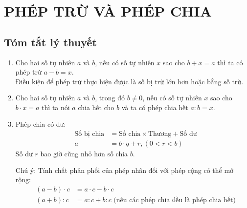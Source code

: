 
\section{PHÉP TRỪ VÀ PHÉP CHIA}
\subsection{Tóm tắt lý thuyết}
\begin{enumerate}
\item Cho hai số tự nhiên $a$ và $b$, nếu có số tự nhiên $x$ sao cho $b + x = a$ thì ta có phép trừ $a - b = x$.\\
Điều kiện để phép trừ thực hiện được là số bị trừ lớn hơn hoặc bằng số trừ.
\item Cho hai số tự nhiên $a$ và $b$, trong đó $b \neq 0$, nếu có số tự nhiên $x$ sao cho $b\cdot x = a$ thì ta nói $a$ chia hết cho $b$ và ta có phép chia hết $a \colon b = x$.
\item Phép chia có dư:
\begin{eqnarray*}
	&\mbox{Số bị chia} & =  \mbox{Số chia} \times \mbox{Thương} + \mbox{Số dư}\\
		&a & =  b \cdot q + r, \left( 0 < r <b\right)
\end{eqnarray*}
Số dư $r$ bao giờ cũng nhỏ hơn số chia $b$.
\begin{note}
	Chú ý: Tính chất phân phối của phép nhân đối với phép cộng có thể mở rộng:
\begin{eqnarray*}
	& \left( a - b\right) \cdot c & = a \cdot c - b \cdot c\\
	& \left( a + b\right) : c & = a : c + b : c \mbox{ (nếu các phép chia đều là phép chia hết)}
\end{eqnarray*}
\end{note}
\end{enumerate}



